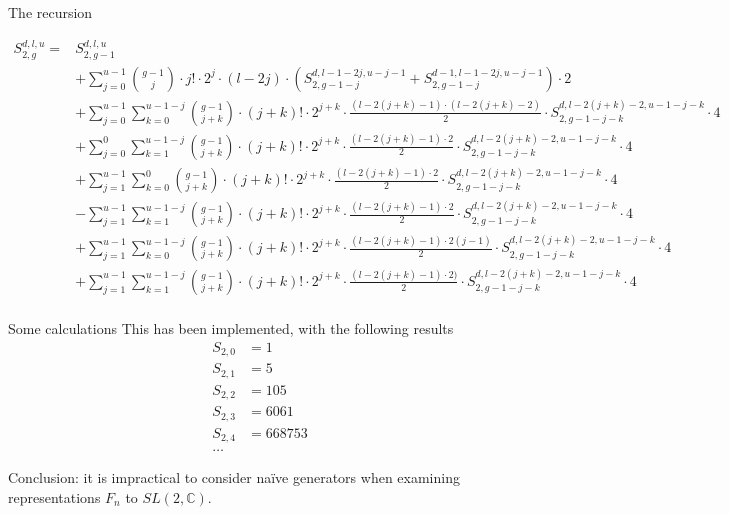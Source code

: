 \documentclass{beamer}
\theoremstyle{definition}
\begin{document}
\begin{frame}{The recursion}

  {\tiny
    \begin{align*}
      S_{2,g}^{d,l,u} =& S_{2,g-1}^{d,l,u} \\
                       &+\sum_{j=0}^{u-1} {g-1 \choose j} \cdot j! \cdot 2^j \cdot (l - 2j) \cdot \left( S_{2,g-1-j}^{d, l-1-2j, u-j-1} + S_{2,g-1-j}^{d-1,l-1-2j,u-j-1} \right) \cdot 2 \\
                       &+  \sum_{j=0}^{u-1} \sum_{k=0}^{u-1-j} { g-1 \choose j + k} \cdot (j + k)! \cdot 2^{j + k} \cdot \frac{(l - 2(j + k) - 1) \cdot (l - 2 (j + k) - 2)}{2} \cdot S_{2,g-1-j-k}^{d,l-2(j+k) - 2,u-1-j-k} \cdot 4 \\
                       &+ \sum_{j=0}^{0} \sum_{k=1}^{u-1-j} { g-1 \choose j + k} \cdot (j + k)! \cdot 2^{j + k} \cdot \frac{(l - 2(j + k) - 1) \cdot 2}{2} \cdot S_{2,g-1-j-k}^{d,l-2(j+k) - 2,u-1-j-k} \cdot 4 \\
                       &+ \sum_{j=1}^{u-1} \sum_{k=0}^{0} { g-1 \choose j + k} \cdot (j + k)! \cdot 2^{j + k} \cdot \frac{(l - 2(j + k) - 1) \cdot 2}{2} \cdot S_{2,g-1-j-k}^{d,l-2(j+k) - 2,u-1-j-k} \cdot 4 \\
                       &- \sum_{j=1}^{u-1} \sum_{k=1}^{u-1-j} { g-1 \choose j + k} \cdot (j + k)! \cdot 2^{j + k} \cdot \frac{(l - 2(j + k) - 1) \cdot 2}{2} \cdot S_{2,g-1-j-k}^{d,l-2(j+k) - 2,u-1-j-k} \cdot 4 \\
                       &+ \sum_{j=1}^{u-1} \sum_{k=0}^{u-1-j} { g-1 \choose j + k} \cdot (j + k)! \cdot 2^{j + k} \cdot \frac{(l - 2(j + k) - 1) \cdot 2(j-1)}{2} \cdot S_{2,g-1-j-k}^{d,l-2(j+k) - 2,u-1-j-k} \cdot 4\\
                       &+ \sum_{j=1}^{u-1} \sum_{k=1}^{u-1-j} { g-1 \choose j + k} \cdot (j + k)! \cdot 2^{j + k} \cdot \frac{(l - 2(j + k) - 1) \cdot 2)}{2} \cdot S_{2,g-1-j-k}^{d,l-2(j+k) - 2,u-1-j-k} \cdot 4\\
    \end{align*}
  }

\end{frame}

\begin{frame}{Some calculations}
  This has been implemented, with the following results
  \begin{align*}
    S_{2,0} &= 1 \\
    S_{2,1} &= 5 \\
    S_{2,2} &= 105 \\
    S_{2,3} &= 6061 \\
    S_{2,4} &= 668753 \\
    \ldots
  \end{align*}

  Conclusion: it is impractical to consider na\"ive generators when
  examining representations $F_n$ to $SL(2, \mathbb{C})$.
\end{frame}

\end{document}

